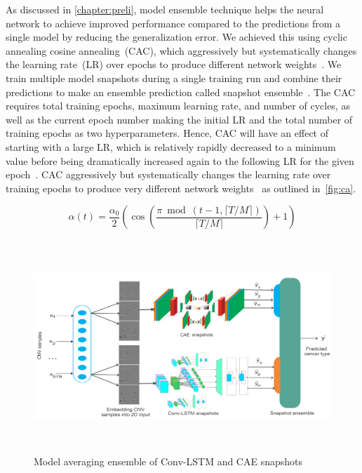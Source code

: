 \hspace*{3.5mm} As discussed in \cref{chapter:preli}, model ensemble technique helps the neural network to achieve improved performance compared to the predictions from a single model by reducing the generalization error. 
We achieved this using cyclic annealing cosine annealing~(CAC), which aggressively but systematically changes the learning rate~(LR) over epochs to produce different network weights~\cite{loshchilov2016sgdr}. We train multiple model snapshots during a single training run and combine their predictions to make an ensemble prediction called snapshot ensemble~\cite{huang2017snapshot}. 
The CAC requires total training epochs, maximum learning rate, and number of cycles, as well as the current epoch number making the initial LR and the total number of training epochs as two hyperparameters. Hence, CAC will have an effect of starting with a large LR, which is relatively rapidly decreased to a minimum value before being dramatically increased again to the following LR for the given epoch~\cite{huang2017snapshot}. CAC aggressively but systematically changes the learning rate over training epochs to produce very different network weights~\cite{loshchilov2016sgdr} as outlined in~\cref{fig:ca}. 

\begin{equation}
    \label{eq:lr-cosine}
    \alpha(t)=\frac{\alpha_{0}}{2}\left(\cos \left(\frac{\pi \bmod (t-1,\lceil T / M\rceil)}{\lceil T / M\rceil}\right)+1\right)
\end{equation}

\begin{figure}
    \centering
        \includegraphics[width=\linewidth,height=80mm]{images/snapshot_ensemble.png}
    \caption{Model averaging ensemble of Conv-LSTM and CAE snapshots~\cite{karimACCA2019}}
    \label{fig:mae}
    \vspace{-2mm}
\end{figure}

